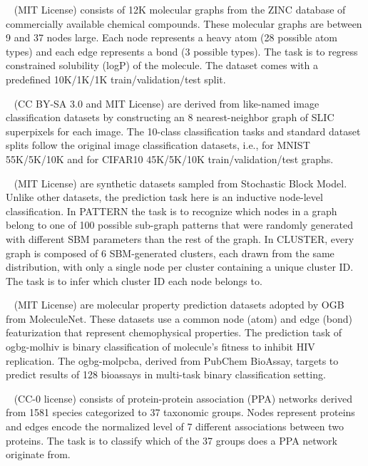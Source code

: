 \documentclass{article}
\begin{document}
~\cite{dwivedi2020benchmarking} (MIT License) consists of 12K molecular graphs from the ZINC database of commercially available chemical compounds. These molecular graphs are between 9 and 37 nodes large. Each node represents a heavy atom (28 possible atom types) and each edge represents a bond (3 possible types). The task is to regress constrained solubility (logP) of the molecule. The dataset comes with a predefined 10K/1K/1K train/validation/test split.

~\cite{dwivedi2020benchmarking} (CC BY-SA 3.0 and MIT License) are derived from like-named image classification datasets by constructing an 8 nearest-neighbor graph of SLIC superpixels for each image. The 10-class classification tasks and standard dataset splits follow the original image classification datasets, i.e., for MNIST 55K/5K/10K and for CIFAR10 45K/5K/10K train/validation/test graphs.

~\cite{dwivedi2020benchmarking} (MIT License) are synthetic datasets sampled from Stochastic Block Model. Unlike other datasets, the prediction task here is an inductive node-level classification. In PATTERN the task is to recognize which nodes in a graph belong to one of 100 possible sub-graph patterns that were randomly generated with different SBM parameters than the rest of the graph. In CLUSTER, every graph is composed of 6 SBM-generated clusters, each drawn from the same distribution, with only a single node per cluster containing a unique cluster ID. The task is to infer which cluster ID each node belongs to.

~\cite{hu2020ogb} (MIT License) are molecular property prediction datasets adopted by OGB from MoleculeNet. These datasets use a common node (atom) and edge (bond) featurization that represent chemophysical properties. The prediction task of ogbg-molhiv is binary classification of molecule's fitness to inhibit HIV replication. The ogbg-molpcba, derived from PubChem BioAssay, targets to predict results of 128 bioassays in multi-task binary classification setting.

~\cite{hu2020ogb} (CC-0 license) consists of protein-protein association (PPA) networks derived from 1581 species categorized to 37 taxonomic groups. Nodes represent proteins and edges encode the normalized level of 7 different associations between two proteins. The task is to classify which of the 37 groups does a PPA network originate from.
\end{document}
